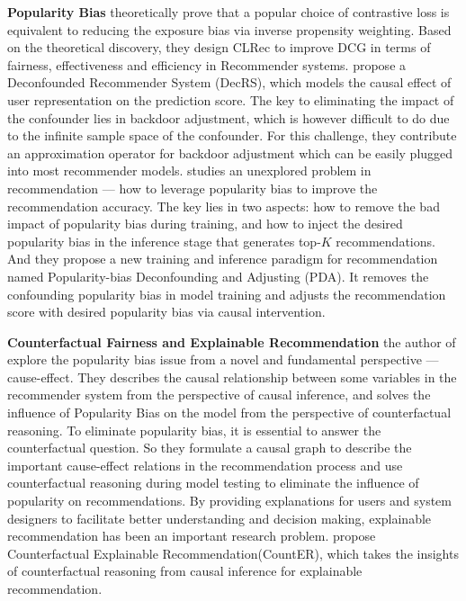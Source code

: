 \documentclass{article}
\begin{document}
\textbf{Popularity Bias} \cite{zhou2021contrastive} theoretically prove that a popular choice
of contrastive loss is equivalent to reducing the exposure bias via inverse propensity weighting. Based on the theoretical discovery, they design CLRec to improve DCG in terms of fairness, effectiveness and efficiency in Recommender systems.\cite{wang2021deconfounded} propose a Deconfounded Recommender System (DecRS), which models the causal effect of user representation on the prediction score. The key to eliminating the impact of the confounder lies in backdoor adjustment, which is however difficult to do due to the infinite sample space of the confounder. For this challenge, they contribute an approximation operator for backdoor adjustment which can be easily plugged into most recommender models.\cite{zhang2021causal} studies an unexplored problem in recommendation — how to leverage popularity bias to improve the recommendation accuracy. The key lies in two aspects: how to remove the bad impact of popularity bias during training, and how to inject the desired popularity bias in the inference stage that generates top-$K$ recommendations. And they propose a new training and inference paradigm for recommendation named Popularity-bias Deconfounding and Adjusting (PDA). It removes the confounding popularity bias in model training and adjusts the recommendation score with desired popularity bias via causal intervention.


\textbf{Counterfactual Fairness and Explainable Recommendation}
the author of\cite{wei2021model} explore the popularity bias issue from a novel and fundamental perspective — cause-effect. They describes the causal relationship between some variables in the recommender system from the perspective of causal inference, and solves the influence of Popularity Bias on the model from the perspective of counterfactual reasoning. To eliminate popularity bias, it is essential to answer the counterfactual question. So they formulate a causal graph to describe the important cause-effect relations in the recommendation process and use counterfactual reasoning during model testing to eliminate the influence of popularity on recommendations. By providing explanations for users and system designers to facilitate better understanding and decision making, explainable recommendation has been an important research problem. \cite{tan2021counterfactual} propose Counterfactual Explainable Recommendation(CountER), which takes the insights of counterfactual reasoning from causal inference for explainable recommendation.
\end{document}
